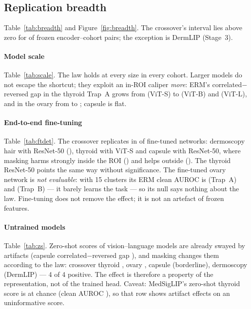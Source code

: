 \subsection{Replication breadth}
Table~\ref{tab:breadth} and Figure~\ref{fig:breadth}. The crossover's interval lies above zero for \sFiveNFrozenPos{} of
\sFiveNFrozen{} frozen encoder--cohort pairs; the exception is DermLIP (Stage~3).
\paragraph{Model scale} Table~\ref{tab:scale}. The law holds at every size in every cohort. Larger models do not escape
the shortcut; they exploit an in-ROI caliper \emph{more}: ERM's correlated$-$reversed gap in the thyroid Trap~A grows
from \sFiveGapthyroidViTS{} (ViT-S) to \sFiveGapthyroidViTB{} (ViT-B) and \sFiveGapthyroidViTL{} (ViT-L), and in the ovary
from \sFiveGapovaryViTS{} to \sFiveGapovaryViTL; capsule is flat.

\paragraph{End-to-end fine-tuning} Table~\ref{tab:ftdet}. The crossover replicates in \sFiveNFtPos{} of \sFiveNFt{}
fine-tuned networks: dermoscopy hair with ResNet-50 (\sFiveFtDermoscopyhairResNetFiveZero), thyroid with ViT-S and
capsule with ResNet-50, where masking harms strongly inside the ROI (\sFiveFtACapsuleResNetFiveZero) and helps outside
(\sFiveFtBCapsuleResNetFiveZero). The thyroid ResNet-50 points the same way without significance. The fine-tuned ovary
network is \emph{not evaluable}: with 15 clusters its ERM clean AUROC is \sFiveOvFtCleanA{} (Trap~A) and \sFiveOvFtCleanB{}
(Trap~B) --- it barely learns the task --- so its null says nothing about the law. Fine-tuning does not remove the effect;
it is not an artefact of frozen features.

\paragraph{Untrained models} Table~\ref{tab:zs}. Zero-shot scores of vision--language models are already swayed by
artifacts (capsule correlated$-$reversed gap \sFiveZsGapcapsule), and masking changes them according to the law: crossover
thyroid \sFiveZsthyroid, ovary \sFiveZsovary, capsule \sFiveZscapsule{} (borderline), dermoscopy (DermLIP) \sFiveZsisic{}
--- 4 of 4 positive. The effect is therefore a property of the representation, not of the trained head. Caveat:
MedSigLIP's zero-shot thyroid score is at chance (clean AUROC \sFiveZsCleanthyroid), so that row shows artifact effects on
an uninformative score.

